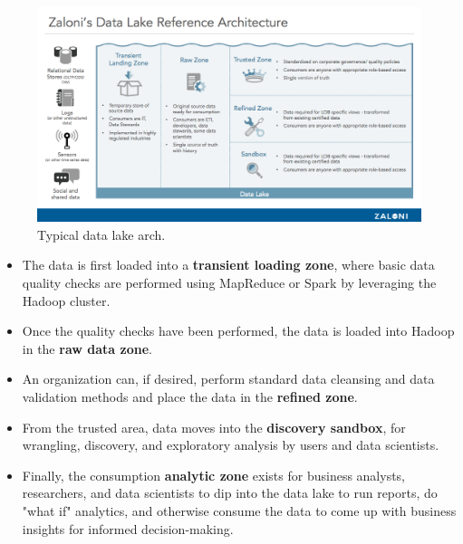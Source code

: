 \documentclass[a4page, 11pt]{article}
\begin{document}
\begin{figure}
\centering
\includegraphics[width=120mm]{data_lake_arch.png}
\caption{\label{data_lake_arch:fig} Typical data lake arch.
}
\end{figure}


\begin{itemize}
\item The data is first loaded into a \textbf{transient loading zone}, where basic data quality checks are performed using MapReduce or Spark by leveraging the Hadoop cluster. 
\item Once the quality checks have been performed, the data is loaded into Hadoop in the \textbf{raw data zone}.

\item An organization can, if desired, perform standard data cleansing and data validation methods and place the data in the \textbf{refined zone}. 

\item From the trusted area, data moves into the \textbf{discovery sandbox}, for wrangling, discovery, and exploratory analysis by users and data scientists.

\item Finally, the consumption \textbf{analytic zone} exists for business analysts, researchers, and data scientists to dip into the data lake to run reports, do "what if" analytics, and otherwise consume the data to come up with business insights for informed decision-making.

\end{itemize}
\end{document}

